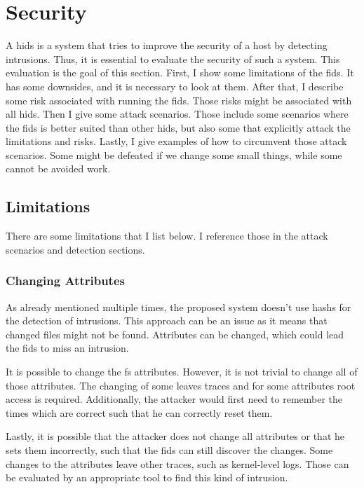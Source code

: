 
\section{Security}
\label{sec:Security}

A \gls{hids} is a system that tries to improve the security of a host by detecting intrusions. Thus, it is essential to evaluate the security of such a system. This evaluation is the goal of this section. First, I show some limitations of the \gls{fids}. It has some downsides, and it is necessary to look at them. After that, I describe some risk associated with running the \gls{fids}. Those risks might be associated with all \gls{hids}. Then I give some attack scenarios. Those include some scenarios where the \gls{fids} is better suited than other \gls{hids}, but also some that explicitly attack the limitations and risks. Lastly, I give examples of how to circumvent those attack scenarios. Some might be defeated if we change some small things, while some cannot be avoided work.

\subsection{Limitations}
\label{sec:Limitations}

There are some limitations that I list below. I reference those in the attack scenarios and detection sections.

\subsubsection{Changing Attributes}
\label{sec:limitation:chattr}

As already mentioned multiple times, the proposed system doesn't use \glspl{hash} for the detection of intrusions. This approach can be an issue as it means that changed files might not be found. Attributes can be changed, which could lead the \gls{fids} to miss an intrusion.  \cite{chaning:times, changing:attributes}

It is possible to change the \gls{fs} attributes. However, it is not trivial to change all of those attributes. The changing of some leaves traces and for some attributes root access is required. Additionally, the attacker would first need to remember the times which are correct such that he can correctly reset them. 

Lastly, it is possible that the attacker does not change all attributes or that he sets them incorrectly, such that the \gls{fids} can still discover the changes. Some changes to the attributes leave other traces, such as kernel-level logs. Those can be evaluated by an appropriate tool to find this kind of intrusion.

